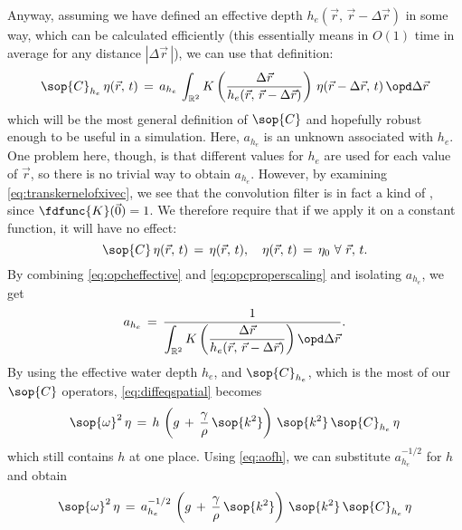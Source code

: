 Anyway, assuming we have defined an effective depth \mbox{$h_e(\vec{r},\,\vec{r}-\Delta\vec{r})$} in some way, which can be calculated efficiently (this essentially means in $O(1)$ time in average for any distance $|\Delta\vec{r}\,|$), we can use that definition:
%
\begin{equation} \label{eq:opcheffective}
\sop{C}_{h_e}\,\eta(\vec{r},\,t) \,=\, a_{h_e}\,\int_{\mathbb{R}^2}K\left(\frac{\Delta\vec{r}}{h_e(\vec{r},\,\vec{r}-\Delta\vec{r})}\right)\,\eta(\vec{r}-\Delta\vec{r},\,t)\,\opd\Delta\vec{r}
\end{equation}
%
which will be the most general definition of $\sop{C}$ and hopefully robust enough to be useful in a simulation. Here, $a_{h_e}$ is an unknown  associated with $h_e$. One problem here, though, is that different values for $h_e$ are used for each value of $\vec{r}$, so there is no trivial way to obtain $a_{h_e}$. However, by examining \eqref{eq:transkernelofxivec}, we see that the convolution filter is in fact a kind of , since $\fdfunc{K}(\vec{0}) = 1$. We therefore require that if we apply it on a constant function, it will have no effect:
%
\begin{equation} \label{eq:opcproperscaling}
\sop{C}\,\eta(\vec{r},\,t) \,=\, \eta(\vec{r},\,t),\quad\eta(\vec{r},\,t) \,=\, \eta_0\ \forall\ \vec{r},\,t.
\end{equation}
%
By combining \eqref{eq:opcheffective} and \eqref{eq:opcproperscaling} and isolating $a_{h_e}$, we get
%
\begin{equation} \label{eq:scalingheffective}
a_{h_e} \,=\, \frac{1}{\displaystyle\int_{\mathbb{R}^2}K\left(\frac{\Delta\vec{r}}{h_e(\vec{r},\,\vec{r}-\Delta\vec{r})}\right) \opd\Delta\vec{r}}.
\end{equation}
%
By using the effective water depth $h_e$, and $\sop{C}_{h_e}$, which is the most  of our $\sop{C}$ operators, \eqref{eq:diffeqspatial} becomes
%
\begin{equation} \label{eq:diffeqonehstillunknown}
\sop{\omega}^2\,\eta \,=\, h\,\left(g\,+\,\frac{\gamma}{\rho}\,\sop{k^2}\right)\,\sop{k^2}\,\sop{C}_{h_e}\,\eta
\end{equation}
%
which still contains $h$ at one place. Using \eqref{eq:aofh}, we can substitute $a_{h_e}^{-1/2}$ for $h$ and obtain
%
\begin{equation} \label{eq:diffeqcomplete}
\sop{\omega}^2\,\eta \,=\, a_{h_e}^{-1/2}\,\left(g\,+\,\frac{\gamma}{\rho}\,\sop{k^2}\right)\,\sop{k^2}\,\sop{C}_{h_e}\,\eta
\end{equation}
